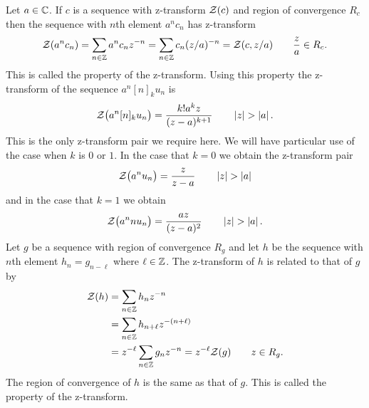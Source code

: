 Let $a \in {\mathbb C}$.  If $c$ is a sequence with z-transform ${\mathcal Z}(c)$ and region of convergence $R_c$ then the sequence with $n$th element $a^nc_n$ has z-transform 
\[
{\mathcal Z}(a^n c_n) = \sum_{n \in {\mathbb Z}} a^n c_n z^{-n} = \sum_{n \in {\mathbb Z}} c_n (z/a)^{-n} = {\mathcal Z}(c, z/a) \qquad \frac{z}{a} \in R_c.
\]
This is called the  property of the z-transform.  Using this property the z-transform of the sequence $a^n [n]_k u_n$ is
\begin{equation}\label{eeq:onlyztrans}
{\mathcal Z}\big( a^n [n]_k u_n \big) = \frac{k! a^k z }{(z - a)^{k+1}} \qquad \left\vert z \right\vert > \left\vert a \right\vert.
\end{equation}
This is the only z-transform pair we require here.  We will have particular use of the case when $k$ is $0$ or $1$.  In the case that $k=0$ we obtain the z-transform pair
\[
{\mathcal Z}\big( a^n u_n \big) = \frac{ z }{z - a} \qquad \left\vert z \right\vert > \left\vert a \right\vert
\]
and in the case that $k=1$ we obtain
\[
{\mathcal Z}\big( a^n n u_n \big) = \frac{ a z }{(z - a)^{2}} \qquad \left\vert z \right\vert > \left\vert a \right\vert.
\]
Let $g$ be a sequence with region of convergence $R_g$ and let $h$ be the sequence with $n$th element $h_n = g_{n-\ell}$ where $\ell \in {\mathbb Z}$.  The z-transform of $h$ is related to that of $g$ by
\begin{align}
{\mathcal Z}(h) &= \sum_{n \in {\mathbb Z}} h_n z^{-n} \nonumber \\
&= \sum_{n \in {\mathbb Z}} h_{n+\ell} z^{-(n+\ell)} \nonumber \\
&= z^{-\ell} \sum_{n \in {\mathbb Z}} g_n z^{-n} = z^{-\ell} {\mathcal Z}(g) \qquad z \in R_g. \label{eq:timeshiftpropertyztransform}
\end{align}
The region of convergence of $h$ is the same as that of $g$.  This is called the  property of the z-transform.  %


